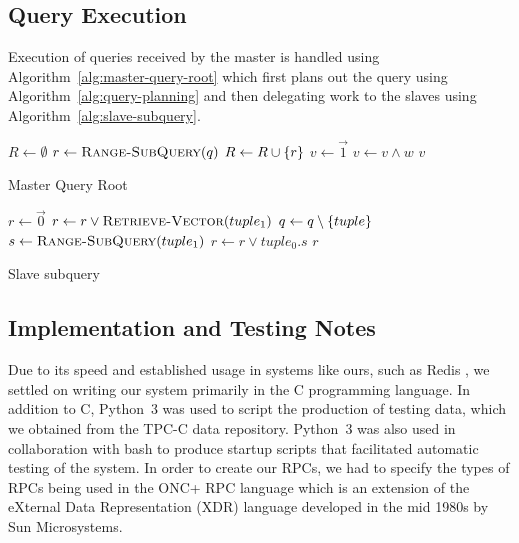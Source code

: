 \subsection{Query Execution}
Execution of queries received by the master is handled using
Algorithm~\ref{alg:master-query-root} which first plans out the query using
Algorithm~\ref{alg:query-planning} and then delegating work to the slaves using
Algorithm~\ref{alg:slave-subquery}.
%
\begin{algorithm}
    \begin{algorithmic}
            \State $R \gets \emptyset$
                \State $r \gets \Call{Range-SubQuery}{q}$
                \State $R \gets R \cup \left\{r\right\}$
            \EndFor
            \State $v \gets \vec{1}$
                \State $v \gets v \land w$
            \EndFor
            \State \Return $v$
        \EndProcedure
    \end{algorithmic}
    \caption{Master Query Root}
    \label{alg:master-query-root}
\end{algorithm}
%
\begin{algorithm}
    \begin{algorithmic}
            \State $r \gets \vec{0}$
                    \State $r \gets r \lor \Call{Retrieve-Vector}{tuple_1}$
                    \State $q \gets q \setminus \left\{tuple\right\}$
                \Else
                    \State $s \gets \Call{Range-SubQuery}{tuple_1}$
                    \State $r \gets r \lor tuple_0.s$
                    \State \Break
                \EndIf
            \EndFor
            \State \Return $r$
        \EndProcedure
    \end{algorithmic}
    \caption{Slave subquery}
    \label{alg:slave-subquery}
\end{algorithm}
%
\subsection{Implementation and Testing Notes}
Due to its speed and established usage in systems like ours, such as Redis
\cite{redis}, we settled on writing our system primarily in the C programming
language. In addition to C, Python~3 was used to script the production of
testing data, which we obtained from the TPC-C data repository. Python~3 was
also used in collaboration with bash to produce startup scripts that
facilitated automatic testing of the system. In order to create our RPCs, we
had to specify the types of RPCs being used in the ONC+ RPC language which is
an extension of the eXternal Data Representation (XDR) language developed in
the mid 1980s by Sun Microsystems.

